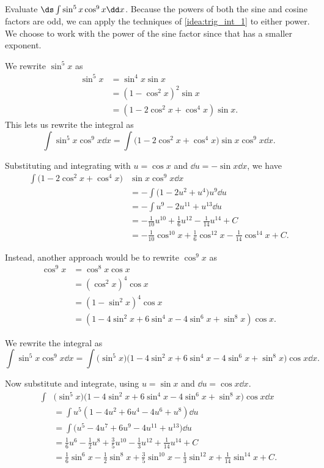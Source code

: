 \begin{example}\label{ex_trigint2}%
Evaluate $\ds \int\sin^5x\cos^9x\dd x$.
\solution
Because the powers of both the sine and cosine factors are odd, we can apply the techniques of \autoref{idea:trig_int_1} to either power.
We choose to work with the power of the sine factor since that has a smaller exponent.

We rewrite $\sin^5x$ as
\begin{align*}
 \sin^5x&=\sin^4x\sin x\\
 &=(1-\cos^2x)^2\sin x\\
 &=(1-2\cos^2x+\cos^4x)\sin x.
\end{align*}
This lets us rewrite the integral as
\[
\int\sin^5x\cos^9x\dd x=\int\bigl(1-2\cos^2x+\cos^4x\bigr)\sin x\cos^9x\dd x.
\]

Substituting and integrating with $u=\cos x$ and $\dd u=-\sin x\dd x$, we have
\begin{align*}
\int\bigl(1-2\cos^2x+\cos^4x\bigr)&\sin x\cos^9x\dd x\\
&=-\int\bigl(1-2u^2+u^4\bigr)u^9\dd u\\
&=-\int u^9-2u^{11}+u^{13}\dd u\\
&=-\frac1{10}u^{10}+\frac16u^{12}-\frac1{14}u^{14}+C\\
&=-\frac1{10}\cos^{10}x+\frac16\cos^{12}x-\frac1{14}\cos^{14}x+C.
\end{align*}

Instead, another approach would be to rewrite $\cos^9x$ as
\begin{align*} \cos^9 x &= \cos^8x\cos x \\
				&= (\cos^2x)^4\cos x \\
				&= (1-\sin^2x)^4\cos x \\
				&= (1-4\sin^2x+6\sin^4x-4\sin^6x+\sin^8x)\cos x.
\end{align*}

We rewrite the integral as 
\[\int\sin^5x\cos^9x\dd x = \int\bigl(\sin^5x\bigr)\bigl(1-4\sin^2x+6\sin^4x-4\sin^6x+\sin^8x\bigr)\cos x\dd x.\]

Now substitute and integrate, using $u = \sin x $ and $\dd u = \cos x\dd x$.
\begin{align*}
 \int & \bigl(\sin^5x\bigr)\bigl(1-4\sin^2x+6\sin^4x-4\sin^6x+\sin^8x\bigr)\cos x\dd x \\
 &=\int u^5(1-4u^2+6u^4-4u^6+u^8)\dd u \\
 &= \int\bigl(u^5-4u^7+6u^9-4u^{11}+u^{13}\bigr)\dd u \\
 &= \frac16u^6-\frac12u^8+\frac35u^{10}-\frac13u^{12}+\frac{1}{14}u^{14}+C\\
 &= \frac16\sin^6 x-\frac12\sin^8 x+\frac35\sin^{10} x-\frac13\sin^{12} x+\frac{1}{14}\sin^{14} x+C.
\end{align*}
%
\end{example}

